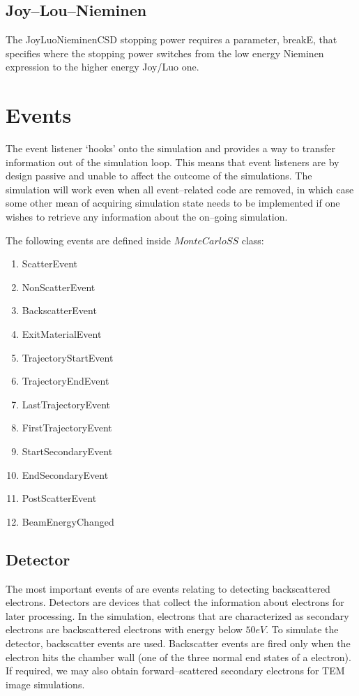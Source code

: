 \subsection{Joy--Lou--Nieminen}
The JoyLuoNieminenCSD stopping power requires a parameter, breakE, that specifies where the stopping power switches from the low energy Nieminen expression to the higher energy Joy/Luo one.

\section{Events}\label{impl:events}
The event listener `hooks' onto the simulation and provides a way to transfer information out of the simulation loop. This means that event listeners are by design passive and unable to affect the outcome of the simulations. The simulation will work even when all event--related code are removed, in which case some other mean of acquiring simulation state needs to be implemented if one wishes to retrieve any information about the on--going simulation.

The following events are defined inside $MonteCarloSS$ class:
\begin{enumerate}
\item ScatterEvent
\item NonScatterEvent
\item BackscatterEvent
\item ExitMaterialEvent
\item TrajectoryStartEvent
\item TrajectoryEndEvent
\item LastTrajectoryEvent
\item FirstTrajectoryEvent
\item StartSecondaryEvent
\item EndSecondaryEvent
\item PostScatterEvent
\item BeamEnergyChanged
\end{enumerate}

\subsection{Detector}\label{subsec:detector}
The most important events of are events relating to detecting backscattered electrons. Detectors are devices that collect the information about electrons for later processing. In the simulation, electrons that are characterized as secondary electrons are backscattered electrons with energy below $50 eV$. To simulate the detector, backscatter events are used. Backscatter events are fired only when the electron hits the chamber wall (one of the three normal end states of a electron). If required, we may also obtain forward--scattered secondary electrons for TEM image simulations.

